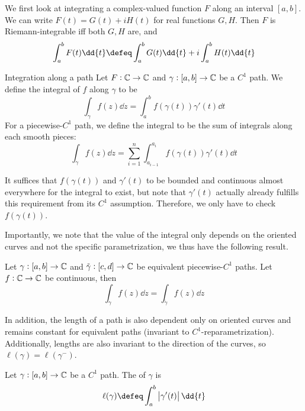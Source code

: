 \documentclass{styles/tufte}
\begin{document}
  We first look at integrating a complex-valued function $F$ along an interval $[a, b]$. We can write $F(t) = G(t) + iH(t)$ for real functions $G, H$. Then $F$ is Riemann-integrable iff both $G, H$ are, and
  \[ \int_a^b F(t) \dd{t} \defeq \int_a^b G(t) \dd{t} + i\int_a^b H(t) \dd{t} \]
  
  
  \begin{definition}{Integration along a path}{}
    Let $F: \mathbb{C} \to \mathbb{C}$ and $\gamma: [a, b] \to \mathbb{C}$ be a $C^1$ path. We define the integral of $f$ along $\gamma$ to be
    \[ \int_\gamma f(z) \dd{z} = \int_a^b f\left(\gamma(t)\right) \gamma'(t) \dd{t} \]
    For a piecewise-$C^1$ path, we define the integral to be the sum of integrals along each smooth pieces:
    \[ \int_\gamma f(z) \dd{z} = \sum_{i=1}^n \int_{a_{i-1}}^{a_i} f\left(\gamma(t)\right) \gamma'(t) \dd{t} \]
  \end{definition}
  
  It suffices that $f(\gamma(t))$ and $\gamma'(t)$ to be bounded and continuous almost everywhere for the integral to exist, but note that $\gamma'(t)$ actually already fulfills this requirement from its $C^1$ assumption. Therefore, we only have to check $f(\gamma(t))$.
  
  Importantly, we note that the value of the integral only depends on the oriented curves and not the specific parametrization, we thus have the following result.
  \begin{lemma}{}{}
    Let $\gamma: [a, b] \to \mathbb{C}$ and $\tilde{\gamma}: [c, d] \to \mathbb{C}$ be equivalent piecewise-$C^1$ paths. Let $f: \mathbb{C} \to \mathbb{C}$ be continuous, then
    \[ \int_\gamma f(z) \dd{z} = \int_{\tilde{\gamma}} f(z) \dd{z} \]
  \end{lemma}
  
  In addition, the length of a path is also dependent only on oriented curves and remains constant for equivalent paths (invariant to $C^1$-reparametrization). Additionally, lengths are also invariant to the direction of the curves, so $\ell(\gamma) = \ell(\gamma^-)$.
  
  \begin{definition}{}{}
    Let $\gamma: [a, b] \to \mathbb{C}$ be a $C^1$ path. The  of $\gamma$ is
    \[ \ell(\gamma) \defeq \int_a^b \abs{\gamma'(t)} \dd{t} \]
  \end{definition}
  
\end{document}
